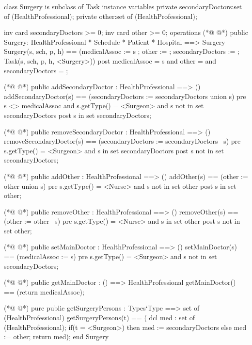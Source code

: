 \begin{vdmpp}[breaklines=true]
class Surgery is subclass of Task
instance variables
  private secondaryDoctors:set of (HealthProfessional);
  private other:set of (HealthProfessional);
  
  inv card secondaryDoctors >= 0;
  inv card other >= 0;
operations
(*@
\label{Surgery:9}
@*)
 public Surgery: HealthProfessional * Schedule * Patient * Hospital ==> Surgery
  Surgery(s, sch, p, h) == (medicalAssoc := s ; other := {}; secondaryDoctors := {}; Task(s, sch, p, h, <Surgery>))
 post medicalAssoc = s and other = {} and secondaryDoctors = {};
 
(*@
\label{addSecondaryDoctor:13}
@*)
 public addSecondaryDoctor : HealthProfessional ==> ()
  addSecondaryDoctor(s) == (secondaryDoctors := secondaryDoctors union {s})
 pre s <> medicalAssoc and s.getType() = <Surgeon> and  s not in set secondaryDoctors
 post s in set secondaryDoctors;
  
(*@
\label{removeSecondaryDoctor:18}
@*)
 public removeSecondaryDoctor : HealthProfessional ==> ()
  removeSecondaryDoctor(s) == (secondaryDoctors := secondaryDoctors \ {s})
 pre s.getType() = <Surgeon> and s in set secondaryDoctors
 post s not in set secondaryDoctors;
  
(*@
\label{addOther:23}
@*)
 public addOther : HealthProfessional ==> ()
  addOther(s) == (other := other union {s})
 pre s.getType() = <Nurse> and s not in set other
 post s in set other;
  
(*@
\label{removeOther:28}
@*)
 public removeOther : HealthProfessional ==> ()
  removeOther(s) == (other := other \ {s})
 pre s.getType() = <Nurse> and s in set other
 post s not in set other;
  
(*@
\label{setMainDoctor:33}
@*)
 public setMainDoctor : HealthProfessional ==> ()
  setMainDoctor(s) == (medicalAssoc := s)
 pre s.getType() = <Surgeon> and s not in set secondaryDoctors;
 
(*@
\label{getMainDoctor:37}
@*)
 public getMainDoctor : () ==> HealthProfessional
  getMainDoctor() == (return medicalAssoc);

(*@
\label{getSurgeryPersons:40}
@*)
 pure public getSurgeryPersons : Types`Type ==> set of (HealthProfessional)
  getSurgeryPersons(t) == (
               dcl med : set of (HealthProfessional);
               if(t = <Surgeon>)
                then med := secondaryDoctors
               else
                med := other;
               return med);
end Surgery
\end{vdmpp}
\bigskip
